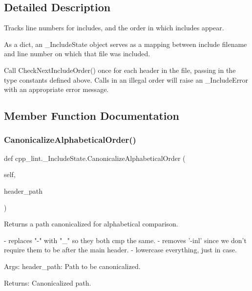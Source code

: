\subsection{Detailed Description}
\begin{DoxyVerb}Tracks line numbers for includes, and the order in which includes appear.

As a dict, an _IncludeState object serves as a mapping between include
filename and line number on which that file was included.

Call CheckNextIncludeOrder() once for each header in the file, passing
in the type constants defined above. Calls in an illegal order will
raise an _IncludeError with an appropriate error message.\end{DoxyVerb}
 

\subsection{Member Function Documentation}
\mbox{\label{classcpp__lint_1_1___include_state_a350d25886a03f0291676f533282f7eb8}} 
\subsubsection{\texorpdfstring{Canonicalize\+Alphabetical\+Order()}{CanonicalizeAlphabeticalOrder()}}
{\footnotesize\ttfamily def cpp\+\_\+lint.\+\_\+\+Include\+State.\+Canonicalize\+Alphabetical\+Order (\begin{DoxyParamCaption}\item[{}]{self,  }\item[{}]{header\+\_\+path }\end{DoxyParamCaption})}

\begin{DoxyVerb}Returns a path canonicalized for alphabetical comparison.

- replaces "-" with "_" so they both cmp the same.
- removes '-inl' since we don't require them to be after the main header.
- lowercase everything, just in case.

Args:
  header_path: Path to be canonicalized.

Returns:
  Canonicalized path.
\end{DoxyVerb}
 \mbox{\label{classcpp__lint_1_1___include_state_abe91796a07f2ade774d3ecb934a67f80}} 
